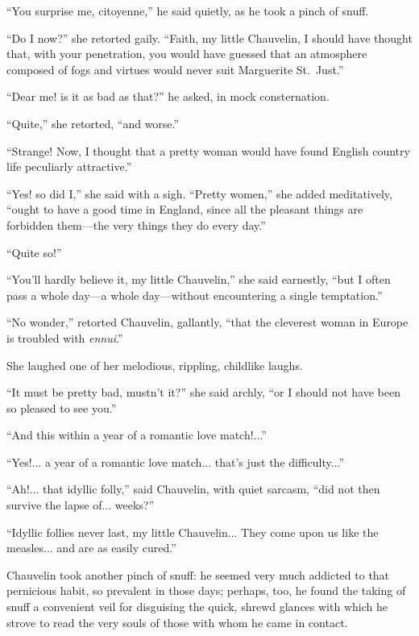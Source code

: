\documentclass[paper=5.5in:8.5in,BCOR=7mm,twoside,DIV=calc,12pt,usegeometry,chapterprefix,endperiod,headings=big]{scrbook}
\begin{document}
\enquote{You surprise me, citoyenne,} he said quietly, as he took a pinch of snuff.

\enquote{Do I now?} she retorted gaily. \enquote{Faith, my little Chauvelin, I should have thought that, with your penetration, you would have guessed that an atmosphere composed of fogs and virtues would never suit Marguerite St.~Just.}

\enquote{Dear me! is it as bad as that?} he asked, in mock consternation.

\enquote{Quite,} she retorted, \enquote{and worse.}

\enquote{Strange! Now, I thought that a pretty woman would have found English country life peculiarly attractive.}

\enquote{Yes! so did I,} she said with a sigh. \enquote{Pretty women,} she added meditatively, \enquote{ought to have a good time in England, since all the pleasant things are forbidden them---the very things they do every day.}

\enquote{Quite so!}

\enquote{You'll hardly believe it, my little Chauvelin,} she said earnestly, \enquote{but I often pass a whole day---a whole day---without encountering a single temptation.}

\enquote{No wonder,} retorted Chauvelin, gallantly, \enquote{that the cleverest woman in Europe is troubled with \textit{ennui}.}

She laughed one of her melodious, rippling, childlike laughs.

\enquote{It must be pretty bad, mustn't it?} she said archly, \enquote{or I should not have been so pleased to see you.}

\enquote{And this within a year of a romantic love match!...}

\enquote{Yes!... a year of a romantic love match... that's just the difficulty...}

\enquote{Ah!... that idyllic folly,} said Chauvelin, with quiet sarcasm, \enquote{did not then survive the lapse of... weeks?}

\enquote{Idyllic follies never last, my little Chauvelin... They come upon us like the measles... and are as easily cured.}

Chauvelin took another pinch of snuff: he seemed very much addicted to that pernicious habit, so prevalent in those days; perhaps, too, he found the taking of snuff a convenient veil for disguising the quick, shrewd glances with which he strove to read the very souls of those with whom he came in contact.
\end{document}
